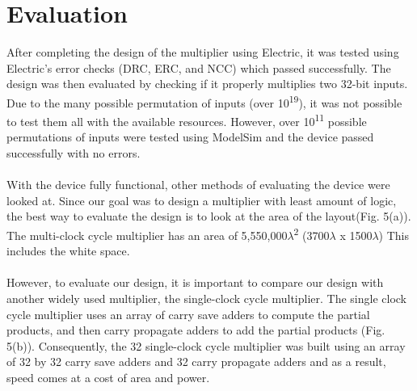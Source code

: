 \documentclass{report}
\begin{document}
 \section*{Evaluation}
 After completing the design of the multiplier using Electric, it was tested using Electric’s error checks (DRC, ERC, and NCC) which passed successfully. The design was then evaluated by checking if it properly multiplies two 32-bit inputs. Due to the many possible permutation of inputs (over 10\textsuperscript{19}), it was not possible to test them all with the available resources. However, over 10\textsuperscript{11} possible permutations of inputs were tested using ModelSim and the device passed successfully with no errors.
 \\\\
 With the device fully functional, other methods of evaluating the device were looked at. Since our goal was to design a multiplier with least amount of logic, the best way to evaluate the design is to look at the area of the layout(Fig. 5(a)). The multi-clock cycle multiplier has an area of 5,550,000$\lambda$\textsuperscript{2} (3700$\lambda$ x 1500$\lambda$) This includes the white space. 
 \\\\
  However, to evaluate our design, it is important to compare our design with another widely used multiplier, the single-clock cycle multiplier. The single clock cycle multiplier uses an array of carry save adders to compute the partial products, and then carry propagate adders to add the partial products (Fig. 5(b)). Consequently, the 32 single-clock cycle multiplier was built using an array of 32 by 32 carry save adders and 32 carry propagate adders and as a result, speed comes at a cost of area and power. 
\end{document}
